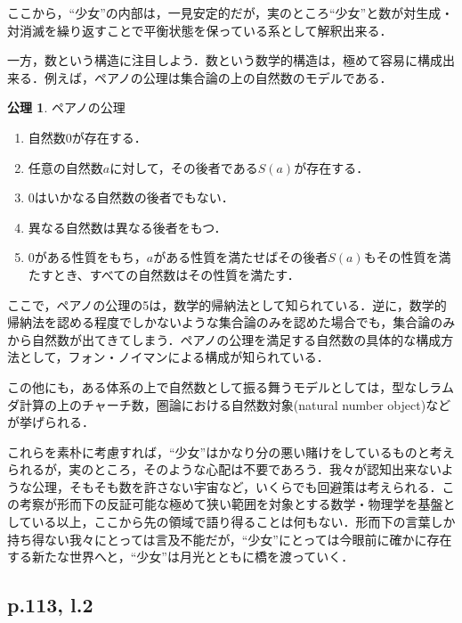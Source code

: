 \documentclass[10pt, a5paper, twoside]{jsarticle}
\theoremstyle{definition}
\newtheorem{axi}{公理}
\begin{document}
			ここから，“少女”の内部は，一見安定的だが，実のところ“少女”と数が対生成・対消滅を繰り返すことで平衡状態を保っている系として解釈出来る．

			一方，数という構造に注目しよう．数という数学的構造は，極めて容易に構成出来る．例えば，ペアノの公理は集合論の上の自然数のモデルである．

			\begin{axi}

				ペアノの公理

				\begin{enumerate}
					\item 自然数$0$が存在する．

					\item 任意の自然数$a$に対して，その後者である$S(a)$が存在する．

					\item $0$はいかなる自然数の後者でもない．

					\item 異なる自然数は異なる後者をもつ．

					\item $0$がある性質をもち，$a$がある性質を満たせばその後者$S(a)$もその性質を満たすとき、すべての自然数はその性質を満たす．
				\end{enumerate}
				
			\end{axi}

			ここで，ペアノの公理の5は，数学的帰納法として知られている．逆に，数学的帰納法を認める程度でしかないような集合論のみを認めた場合でも，集合論のみから自然数が出てきてしまう．ペアノの公理を満足する自然数の具体的な構成方法として，フォン・ノイマンによる構成が知られている．

			この他にも，ある体系の上で自然数として振る舞うモデルとしては，型なしラムダ計算の上のチャーチ数，圏論における自然数対象(natural number object)などが挙げられる．

			これらを素朴に考慮すれば，“少女”はかなり分の悪い賭けをしているものと考えられるが，実のところ，そのような心配は不要であろう．我々が認知出来ないような公理，そもそも数を許さない宇宙など，いくらでも回避策は考えられる．この考察が形而下の反証可能な極めて狭い範囲を対象とする数学・物理学を基盤としている以上，ここから先の領域で語り得ることは何もない．形而下の言葉しか持ち得ない我々にとっては言及不能だが，“少女”にとっては今眼前に確かに存在する新たな世界へと，“少女”は月光とともに橋を渡っていく．

		\subsection{p.113, l.2}
\end{document}
